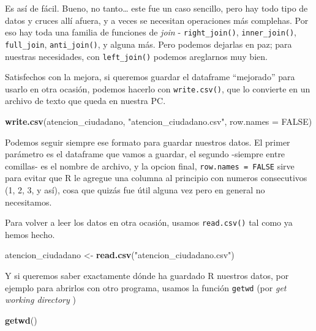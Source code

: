 \documentclass[spanish,]{book}
\newenvironment{Shaded}{\begin{snugshade}}{\end{snugshade}}
\newcommand{\DataTypeTok}[1]{\textcolor[rgb]{0.13,0.29,0.53}{#1}}
\newcommand{\KeywordTok}[1]{\textcolor[rgb]{0.13,0.29,0.53}{\textbf{#1}}}
\newcommand{\NormalTok}[1]{#1}
\newcommand{\OtherTok}[1]{\textcolor[rgb]{0.56,0.35,0.01}{#1}}
\newcommand{\StringTok}[1]{\textcolor[rgb]{0.31,0.60,0.02}{#1}}
\begin{document}
Es así de fácil. Bueno, no tanto\ldots{} este fue un caso sencillo, pero hay todo tipo de datos y cruces allí afuera, y a veces se necesitan operaciones más complehas. Por eso hay toda una familia de funciones de \emph{join} - \texttt{right\_join()}, \texttt{inner\_join()}, \texttt{full\_join}, \texttt{anti\_join()}, y alguna más. Pero podemos dejarlas en paz; para nuestras necesidades, con \texttt{left\_join()} podemos areglarnos muy bien.

Satisfechos con la mejora, si queremos guardar el dataframe ``mejorado'' para usarlo en otra ocasión, podemos hacerlo con \texttt{write.csv()}, que lo convierte en un archivo de texto que queda en nuestra PC.

\begin{Shaded}
\begin{Highlighting}[]
\KeywordTok{write.csv}\NormalTok{(atencion_ciudadano, }\StringTok{"atencion_ciudadano.csv"}\NormalTok{, }\DataTypeTok{row.names =} \OtherTok{FALSE}\NormalTok{)}
\end{Highlighting}
\end{Shaded}

Podemos seguir siempre ese formato para guardar nuestros datos. El primer parámetro es el dataframe que vamos a guardar, el segundo -siempre entre comillas- es el nombre de archivo, y la opcion final, \texttt{row.names\ =\ FALSE} sirve para evitar que R le agregue una columna al principio con numeros consecutivos (1, 2, 3, y así), cosa que quizás fue útil alguna vez pero en general no necesitamos.

Para volver a leer los datos en otra ocasión, usamos \texttt{read.csv()} tal como ya hemos hecho.

\begin{Shaded}
\begin{Highlighting}[]
\NormalTok{atencion_ciudadano <-}\StringTok{ }\KeywordTok{read.csv}\NormalTok{(}\StringTok{"atencion_ciudadano.csv"}\NormalTok{)}
\end{Highlighting}
\end{Shaded}

Y si queremos saber exactamente dónde ha guardado R nuestros datos, por ejemplo para abrirlos con otro programa, usamos la función \texttt{getwd} (por \emph{get working directory} )

\begin{Shaded}
\begin{Highlighting}[]
\KeywordTok{getwd}\NormalTok{()}
\end{Highlighting}
\end{Shaded}
\end{document}
